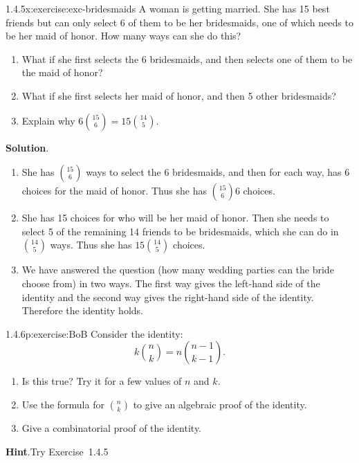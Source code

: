 \documentclass[twoside,11pt,]{book}
\newcommand{\blocktitlefont}{\relax}
\numberwithin{equation}{chapter}
\begin{document}
\begin{divisionsolution}{1.4.5}{}{x:exercise:exc-bridesmaids}%
A woman is getting married. She has 15 best friends but can only select 6 of them to be her bridesmaids, one of which needs to be her maid of honor. How many ways can she do this?%
%
\begin{enumerate}[label=(\alph*)]
\item{}What if she first selects the 6 bridesmaids, and then selects one of them to be the maid of honor?%
\item{}What if she first selects her maid of honor, and then 5 other bridesmaids?%
\item{}Explain why \(6 {15 \choose 6} = 15 {14 \choose 5}\).%
\end{enumerate}
\par\smallskip%
\noindent\textbf{\blocktitlefont Solution}.\quad{}%
\begin{enumerate}[label=(\alph*)]
\item{}She has \({15 \choose 6}\) ways to select the 6 bridesmaids, and then for each way, has 6 choices for the maid of honor. Thus she has \({15 \choose 6}6\) choices.%
\item{}She has 15 choices for who will be her maid of honor. Then she needs to select 5 of the remaining 14 friends to be bridesmaids, which she can do in \({14 \choose 5}\) ways. Thus she has \(15 {14 \choose 5}\) choices.%
\item{}We have answered the question (how many wedding parties can the bride choose from) in two ways. The first way gives the left-hand side of the identity and the second way gives the right-hand side of the identity. Therefore the identity holds.%
\end{enumerate}
%
\end{divisionsolution}%
\begin{divisionsolution}{1.4.6}{}{p:exercise:BoB}%
Consider the identity:%
\begin{equation*}
k{n\choose k} = n{n-1 \choose k-1}\text{.}
\end{equation*}
%
\begin{enumerate}[label=(\alph*)]
\item{}Is this true? Try it for a few values of \(n\) and \(k\).%
\item{}Use the formula for \({n \choose k}\) to give an algebraic proof of the identity.%
\item{}Give a combinatorial proof of the identity.%
\end{enumerate}
%
\par\smallskip%
\noindent\textbf{\blocktitlefont Hint}.\quad{}Try Exercise~1.4.5%
\end{divisionsolution}%
\end{document}
